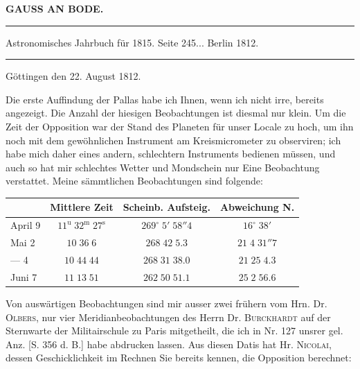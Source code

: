 \clearpage{}\hypertarget{native-362-lower}{}\label{native-362-lower}
\begin{center}\textbf{GAUSS AN BODE.}\par\vspace{4pt}\hrule\vspace{4pt}\fontsize{10}{12}\selectfont Astronomisches Jahrbuch für 1815. Seite 245\;... Berlin 1812.\par\vspace{4pt}\hrule\vspace{4pt}\end{center}

\begin{flushright}Göttingen den 22. August 1812.\end{flushright}
\par\indent Die erste Auffindung der Pallas habe ich Ihnen, wenn ich nicht irre, bereits
angezeigt. Die Anzahl der hiesigen Beobachtungen ist diesmal nur klein. Um
die Zeit der Opposition war der Stand des
Planeten für unser Locale zu hoch, um ihn noch mit dem gewöhnlichen
Instrument am Kreismicrometer zu observiren; ich habe mich daher eines
andern, schlechtern Instruments bedienen müssen, und auch so hat mir
schlechtes Wetter und Mondschein nur Eine Beobachtung verstattet. Meine
sämmtlichen Beobachtungen sind folgende:

\begin{center}\fontsize{10}{12}\selectfont\setlength{\tabcolsep}{4pt}\renewcommand{\arraystretch}{1.15}\begin{tabular}{l|c|c|c}
& Mittlere Zeit & Scheinb. Aufsteig. & Abweichung N.\\\hline
April 9 & $11^{\mathrm u}\;32^{\mathrm m}\;27^{\mathrm s}$ & $269^\circ\;5'\;58''4$ & $16^\circ\;38'$\\
Mai 2 & $10\;36\;6$ & $268\;42\;5.3$ & $21\;4\;31''7$\\
— 4 & $10\;44\;44$ & $268\;31\;38.0$ & $21\;25\;4.3$\\
Juni 7 & $11\;13\;51$ & $262\;50\;51.1$ & $25\;2\;56.6$\\
\end{tabular}\end{center}

\par\indent Von auswärtigen Beobachtungen sind mir ausser zwei frühern vom Hrn. Dr.
\textsc{Olbers}, nur vier Meridianbeobachtungen des Herrn Dr. \textsc{Burckhardt} auf der
Sternwarte der Militairschule zu Paris mitgetheilt, die ich in Nr. 127
unsrer gel. Anz. [S. 356 d. B.] habe abdrucken lassen. Aus diesen Datis hat
Hr. \textsc{Nicolai}, dessen Geschicklichkeit im Rechnen Sie bereits kennen, die
Opposition berechnet:

